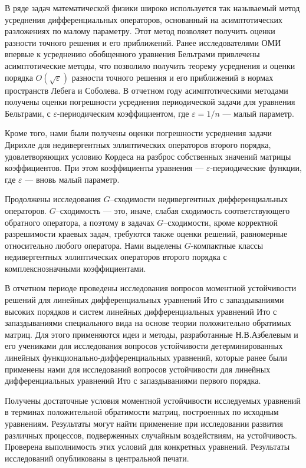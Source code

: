 В ряде задач математической физики широко используется так называемый метод усреднения дифференциальных операторов, основанный на асимптотических разложениях по малому параметру. Этот метод позволяет получить оценки разности точного решения и его приближений.
Ранее исследователями ОМИ впервые к усреднению обобщенного уравнения Бельтрами привлечены асимптотические методы, что позволило получить теорему усреднения и оценки порядка $O(\sqrt{\varepsilon})$ разности точного решения и его приближений в нормах пространств Лебега и Соболева.
В отчетном году асимптотическими методами получены оценки погрешности усреднения периодической задачи для уравнения Бельтрами, с $\varepsilon$-периодическим коэффициентом, где $\varepsilon=1/n$  --- малый параметр.

Кроме того, нами были получены оценки погрешности усреднения задачи Дирихле для недивергентных эллиптических операторов второго порядка, удовлетворяющих условию Кордеса на разброс собственных значений матрицы коэффициентов. При этом коэффициенты уравнения --- $\varepsilon$-периодические функции, где $\varepsilon$ --- вновь малый параметр.




Продолжены исследования  $G$--сходимости недивергентных дифференциальных операторов. $G$--сходимость --- это, иначе, слабая сходимость
соответствующего обратного оператора, а поэтому в задачах $G$--сходимости, кроме корректной разрешимости краевых задач, требуются также оценки решений,
равномерные относительно любого оператора. Нами выделены $G$-компактные классы недивергентных эллиптических операторов второго порядка с комплекснозначными коэффициентами.







В отчетном периоде проведены исследования вопросов моментной устойчивости решений для линейных дифференциальных уравнений Ито с
запаздываниями высоких порядков и систем линейных дифференциальных уравнений Ито с запаздываниями специального вида на
основе теории положительно обратимых матриц. Для этого применяются идеи и методы, разработанные Н.В.Азбелевым и его
учениками для исследования вопросов устойчивости детерминированных линейных функционально-дифференциальных уравнений,
которые ранее были применены нами для исследований вопросов устойчивости для линейных дифференциальных уравнений Ито с
запаздываниями первого порядка.

Получены достаточные условия моментной устойчивости исследуемых уравнений в терминах положительной обратимости матриц, построенных по исходным уравнениям.
Результаты могут найти применение при исследовании развития различных процессов, подверженных случайным воздействиям, на  устойчивость.
Проверена выполнимость этих условий для конкретных уравнений.
Результаты исследований опубликованы в центральной печати.





